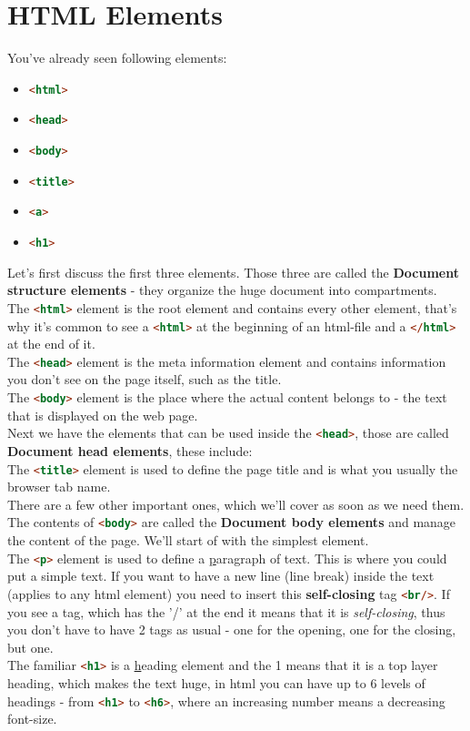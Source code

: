\documentclass[a4paper,12pt]{article}
\newcommand{\htmlelem}[1]{\lstinline[columns=fixed,language=HTML]{#1}}
\newcommand{\nsp}{\vspace{0.05cm}\\}
\begin{document}
\section{HTML Elements}
You've already seen following elements:
\begin{itemize}
    \item \htmlelem{<html>}
    \item \htmlelem{<head>}
    \item \htmlelem{<body>}
    \item \htmlelem{<title>}
    \item \htmlelem{<a>}
    \item \htmlelem{<h1>}
\end{itemize}
Let's first discuss the first three elements. Those three are called the \textbf{Document structure elements} - they organize the huge document into compartments.\nsp
The \htmlelem{<html>} element is the root element and contains every other element, that's why it's common to see a \htmlelem{<html>} at the beginning of an html-file and a \htmlelem{</html>} at the end of it.\nsp
The \htmlelem{<head>} element is the meta information element and contains information you don't see on the page itself, such as the title.\nsp
The \htmlelem{<body>} element is the place where the actual content belongs to - the text that is displayed on the web page.\vspace{0.15cm}\nsp
Next we have the elements that can be used inside the \htmlelem{<head>}, those are called \textbf{Document head elements}, these include:\nsp
The \htmlelem{<title>} element is used to define the page title and is what you usually the browser tab name.\nsp
There are a few other important ones, which we'll cover as soon as we need them.\vspace{0.15cm}\nsp
The contents of \htmlelem{<body>} are called the \textbf{Document body elements} and manage the content of the page. We'll start of with the simplest element.\nsp
The \htmlelem{<p>} element is used to define a \underline{p}aragraph of text. This is where you could put a simple text. If you want to have a new line (line break) inside the text (applies to any html element) you need to insert this \textbf{self-closing} tag \htmlelem{<br/>}. If you see a tag, which has the '/' at the end it means that it is \textit{self-closing}, thus you don't have to have 2 tags as usual - one for the opening, one for the closing, but one.\nsp
The familiar \htmlelem{<h1>} is a \underline{h}eading element and the 1 means that it is a top layer heading, which makes the text huge, in html you can have up to 6 levels of headings - from \htmlelem{<h1>} to \htmlelem{<h6>}, where an increasing number means a decreasing font-size.\nsp
\end{document}
